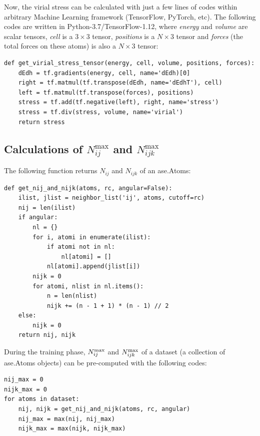 \documentclass[preprint]{revtex4-2}
\begin{document}
Now, the virial stress can be calculated with just a few lines of codes within 
arbitrary Machine Learning framework (TensorFlow, PyTorch, etc). The following 
codes are written in Python-3.7/TensorFlow-1.12, where \textit{energy} and 
\textit{volume} are scalar tensors, \textit{cell} is a $3 \times 3$ tensor, 
\textit{positions} is a $N\times 3$ tensor and \textit{forces} (the total forces 
on these atoms) is also a $N\times 3$ tensor:
\begin{verbatim}
def get_virial_stress_tensor(energy, cell, volume, positions, forces):
    dEdh = tf.gradients(energy, cell, name='dEdh)[0]
    right = tf.matmul(tf.transpose(dEdh, name='dEdhT'), cell)
    left = tf.matmul(tf.transpose(forces), positions)
    stress = tf.add(tf.negative(left), right, name='stress')
    stress = tf.div(stress, volume, name='virial')
    return stress
\end{verbatim}

\newpage

% 
%
\subsection{
    Calculations of \texorpdfstring{$N_{ij}^{\mathrm{max}}$}{Nijmax} and 
    \texorpdfstring{$N_{ijk}^{\mathrm{max}}$}{Nijkmax}
}

The following function returns $N_{ij}$ and $N_{ijk}$ of an \textmd{ase.Atoms}:
\begin{verbatim}
def get_nij_and_nijk(atoms, rc, angular=False):
    ilist, jlist = neighbor_list('ij', atoms, cutoff=rc)
    nij = len(ilist)
    if angular:
        nl = {}
        for i, atomi in enumerate(ilist):
            if atomi not in nl:
                nl[atomi] = []
            nl[atomi].append(jlist[i])
        nijk = 0
        for atomi, nlist in nl.items():
            n = len(nlist)
            nijk += (n - 1 + 1) * (n - 1) // 2
    else:
        nijk = 0
    return nij, nijk
\end{verbatim}
During the training phase, $N_{ij}^{\mathrm{max}}$ and $N_{ijk}^{\mathrm{max}}$ of a dataset (a collection 
of \textmd{ase.Atoms} objects) can be pre-computed with the following codes:
\begin{verbatim}
nij_max = 0
nijk_max = 0
for atoms in dataset:
    nij, nijk = get_nij_and_nijk(atoms, rc, angular)
    nij_max = max(nij, nij_max)
    nijk_max = max(nijk, nijk_max)
\end{verbatim}
\end{document}
